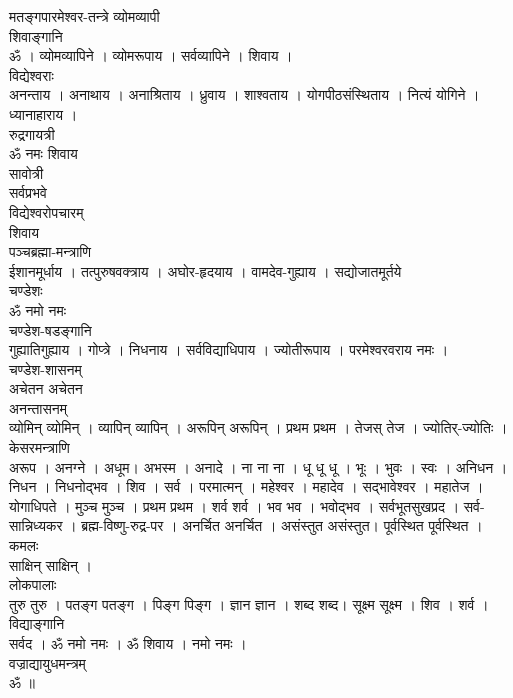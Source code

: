 \documentclass[12pt]{article}
\begin{document}
{\large{\sktr
{\color{Brown}मतङ्गपारमेश्वर-तन्त्रे व्योमव्यापी}\\[5pt]
{\color{CadetBlue} शिवाङ्गानि}\\[5pt]
{\color{NavyBlue}ॐ । व्योमव्यापिने । व्योमरूपाय । सर्वव्यापिने । शिवाय ।}\\[5pt]
{\color{CadetBlue} विद्येश्वराः}\\[5pt]
{\color{NavyBlue}अनन्ताय । अनाथाय । अनाश्रिताय । ध्रुवाय । शाश्वताय । योगपीठसंस्थिताय । नित्यं योगिने । ध्यानाहाराय ।}\\[5pt]
{\color{CadetBlue} रुद्रगायत्री}\\[5pt]
{\color{NavyBlue} ॐ नमः शिवाय }\\[5pt]
{\color{CadetBlue} सावोत्री}\\[5pt]
{\color{NavyBlue}  सर्वप्रभवे }\\[5pt]
{\color{CadetBlue} विद्येश्वरोपचारम् } \\[5pt]
{\color{NavyBlue}  शिवाय}\\[5pt]
{\color{CadetBlue} पञ्चब्रह्मा-मन्त्राणि } \\[5pt]
{\color{NavyBlue} ईशानमूर्धाय । तत्पुरुषवक्त्राय । अघोर-हृदयाय ।  वामदेव-गुह्याय  । सद्योजातमूर्तये }\\[5pt]
{\color{CadetBlue} चण्डेशः } \\[5pt]	
{\color{NavyBlue} ॐ नमो नमः }\\[5pt]
{\color{CadetBlue} चण्डेश-षडङ्गानि } \\[5pt]
{\color{NavyBlue}  गुह्यातिगुह्याय ।  गोप्त्रे  ।  निधनाय । सर्वविद्याधिपाय  ।  ज्योतीरूपाय  । परमेश्वरवराय नमः । }\\[5pt]	
{\color{CadetBlue} चण्डेश-शासनम् } \\[5pt]
{\color{NavyBlue} अचेतन अचेतन}\\[5pt]
{\color{CadetBlue} अनन्तासनम् } \\[5pt]
{\color{NavyBlue}  व्योमिन् व्योमिन् ।  व्यापिन् व्यापिन् । अरूपिन् अरूपिन् । प्रथम प्रथम ।  तेजस् तेज । ज्योतिर्-ज्योतिः । \\[5pt] }
{\color{CadetBlue} केसरमन्त्राणि } \\[5pt]
{\color{NavyBlue}  अरूप । अनग्ने । अधूम। अभस्म । अनादे । ना ना ना ।  धू धू धू ।  भूः । भुवः । स्वः । अनिधन । निधन । निधनोद्भव । शिव ।  सर्व । परमात्मन् । महेश्वर । महादेव । सद्भावेश्वर । महातेज । योगाधिपते ।  मुञ्च मुञ्च । प्रथम प्रथम । शर्व शर्व । भव भव । भवोद्भव । सर्वभूतसुखप्रद ।  सर्व-सान्निध्यकर । ब्रह्म-विष्णु-रुद्र-पर । अनर्चित अनर्चित । असंस्तुत असंस्तुत। पूर्वस्थित पूर्वस्थित । }\\[5pt]
{\color{CadetBlue} कमलः } \\[5pt]	
{\color{NavyBlue} साक्षिन् साक्षिन् ।}\\[5pt]	
{\color{CadetBlue} लोकपालाः } \\[5pt]	
{\color{NavyBlue} तुरु तुरु । पतङ्ग पतङ्ग । पिङ्ग पिङ्ग । ज्ञान ज्ञान । शब्द शब्द। सूक्ष्म सूक्ष्म । शिव । शर्व ।  }\\[5pt]
{\color{CadetBlue} विद्याङ्गानि } \\[5pt]	
{\color{NavyBlue} सर्वद । ॐ नमो नमः । ॐ शिवाय । नमो नमः । }\\[5pt]
{\color{CadetBlue} वज्राद्यायुधमन्त्रम्} \\[5pt]	
{\color{NavyBlue} ॐ ॥}
}}
\end{document}
